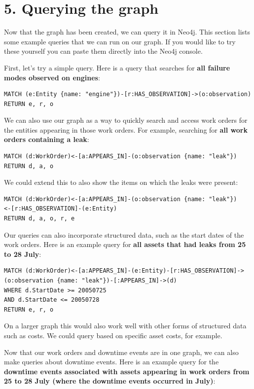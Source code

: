 \documentclass[11pt]{article}
\begin{document}
    \hypertarget{querying-the-graph}{%
\section{5. Querying the graph}\label{querying-the-graph}}

Now that the graph has been created, we can query it in Neo4j. This
section lists some example queries that we can run on our graph. If you
would like to try these yourself you can paste them directly into the
Neo4j console.

First, let's try a simple query. Here is a query that searches for
\textbf{all failure modes observed on engines}:

\begin{verbatim}
MATCH (e:Entity {name: "engine"})-[r:HAS_OBSERVATION]->(o:observation)
RETURN e, r, o
\end{verbatim}

We can also use our graph as a way to quickly search and access work
orders for the entities appearing in those work orders. For example,
searching for \textbf{all work orders containing a leak}:

\begin{verbatim}
MATCH (d:WorkOrder)<-[a:APPEARS_IN]-(o:observation {name: "leak"})
RETURN d, a, o
\end{verbatim}

We could extend this to also show the items on which the leaks were
present:

\begin{verbatim}
MATCH (d:WorkOrder)<-[a:APPEARS_IN]-(o:observation {name: "leak"})
<-[r:HAS_OBSERVATION]-(e:Entity)
RETURN d, a, o, r, e
\end{verbatim}

Our queries can also incorporate structured data, such as the start
dates of the work orders. Here is an example query for \textbf{all
assets that had leaks from 25 to 28 July}:

\begin{verbatim}
MATCH (d:WorkOrder)<-[a:APPEARS_IN]-(e:Entity)-[r:HAS_OBSERVATION]->
(o:observation {name: "leak"})-[:APPEARS_IN]->(d)
WHERE d.StartDate >= 20050725
AND d.StartDate <= 20050728
RETURN e, r, o
\end{verbatim}

On a larger graph this would also work well with other forms of
structured data such as costs. We could query based on specific asset
costs, for example.

Now that our work orders and downtime events are in one graph, we can
also make queries about downtime events. Here is an example query for
the \textbf{downtime events associated with assets appearing in work
orders from 25 to 28 July (where the downtime events occurred in July)}:
\end{document}
